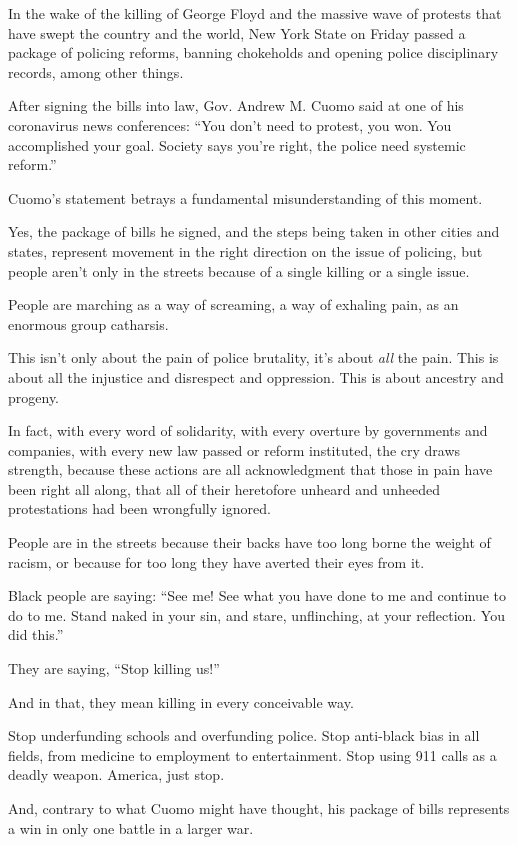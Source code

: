 In the wake of the killing of George Floyd and the massive wave of
protests that have swept the country and the world, New York State on
Friday passed a package of policing reforms, banning chokeholds and
opening police disciplinary records, among other things.

After signing the bills into law, Gov. Andrew M. Cuomo said at one of
his coronavirus news conferences: ``You don't need to protest, you won.
You accomplished your goal. Society says you're right, the police need
systemic reform.''

Cuomo's statement betrays a fundamental misunderstanding of this moment.

Yes, the package of bills he signed, and the steps being taken in other
cities and states, represent movement in the right direction on the
issue of policing, but people aren't only in the streets because of a
single killing or a single issue.

People are marching as a way of screaming, a way of exhaling pain, as an
enormous group catharsis.

This isn't only about the pain of police brutality, it's about
\emph{all} the pain. This is about all the injustice and disrespect and
oppression. This is about ancestry and progeny.

In fact, with every word of solidarity, with every overture by
governments and companies, with every new law passed or reform
instituted, the cry draws strength, because these actions are all
acknowledgment that those in pain have been right all along, that all of
their heretofore unheard and unheeded protestations had been wrongfully
ignored.

People are in the streets because their backs have too long borne the
weight of racism, or because for too long they have averted their eyes
from it.

Black people are saying: ``See me! See what you have done to me and
continue to do to me. Stand naked in your sin, and stare, unflinching,
at your reflection. You did this.''

They are saying, ``Stop killing us!''

And in that, they mean killing in every conceivable way.

Stop underfunding schools and overfunding police. Stop anti-black bias
in all fields, from medicine to employment to entertainment. Stop using
911 calls as a deadly weapon. America, just stop.

And, contrary to what Cuomo might have thought, his package of bills
represents a win in only one battle in a larger war.

